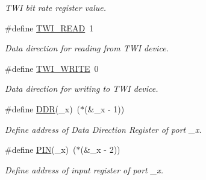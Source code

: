 \begin{DoxyCompactItemize}
\begin{DoxyCompactList}\small\item\em T\+WI bit rate register value. \end{DoxyCompactList}\item 
\#define \hyperlink{a00007_gaaf9a8abccd811954f9cc316f2b2f87b3}{T\+W\+I\+\_\+\+R\+E\+AD}~1
\begin{DoxyCompactList}\small\item\em Data direction for reading from T\+WI device. \end{DoxyCompactList}\item 
\#define \hyperlink{a00007_ga3b68e8e777b71520f9dbfac733774d5f}{T\+W\+I\+\_\+\+W\+R\+I\+TE}~0
\begin{DoxyCompactList}\small\item\em Data direction for writing to T\+WI device. \end{DoxyCompactList}\item 
\#define \hyperlink{a00007_ga6c0346728feb274834cad94daca316ee}{D\+DR}(\+\_\+x)~($\ast$(\&\+\_\+x -\/ 1))
\begin{DoxyCompactList}\small\item\em Define address of Data Direction Register of port \+\_\+x. \end{DoxyCompactList}\item 
\#define \hyperlink{a00007_ga740f9eb9c9f9e33500ee61ec53945f6a}{P\+IN}(\+\_\+x)~($\ast$(\&\+\_\+x -\/ 2))
\begin{DoxyCompactList}\small\item\em Define address of input register of port \+\_\+x. \end{DoxyCompactList}\end{DoxyCompactItemize}

